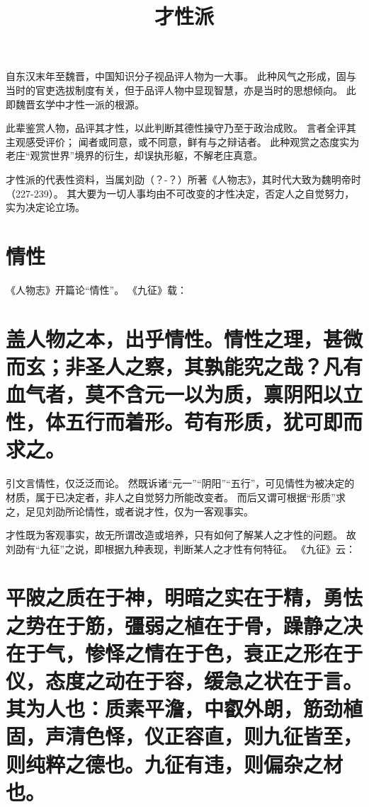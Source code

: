 \documentclass[11pt]{article}
\title{才性派}
\date{}
\begin{document}
  \maketitle

  \linenumbers

自东汉末年至魏晋，中国知识分子视品评人物为一大事。
此种风气之形成，固与当时的官吏选拔制度有关，但于品评人物中显现智慧，亦是当时的思想倾向。
此即魏晋玄学中才性一派的根源。

\par

此辈鉴赏人物，品评其才性，以此判断其德性操守乃至于政治成败。
言者全评其主观感受评价；
闻者或同意，或不同意，鲜有与之辩诘者。
此种观赏之态度实为老庄“观赏世界”境界的衍生，却误执形躯，不解老庄真意。

\par

才性派的代表性资料，当属刘劭（？-？）所著《人物志》，其时代大致为魏明帝时（227-239）。
其大要为一切人事均由不可改变的才性决定，否定人之自觉努力，实为决定论立场。

\section{情性}
《人物志》开篇论“情性”。
《九征》载：

\section{盖人物之本，出乎情性。情性之理，甚微而玄；非圣人之察，其孰能究之哉？凡有血气者，莫不含元一以为质，禀阴阳以立性，体五行而着形。苟有形质，犹可即而求之。}

引文言情性，仅泛泛而论。
然既诉诸“元一”“阴阳”“五行”，可见情性为被决定的材质，属于已决定者，非人之自觉努力所能改变者。
而后又谓可根据“形质”求之，足见刘劭所论情性，或者说才性，仅为一客观事实。

\par

才性既为客观事实，故无所谓改造或培养，只有如何了解某人之才性的问题。
故刘劭有“九征”之说，即根据九种表现，判断某人之才性有何特征。
《九征》云：

\section{平陂之质在于神，明暗之实在于精，勇怯之势在于筋，彊弱之植在于骨，躁静之决在于气，惨怿之情在于色，衰正之形在于仪，态度之动在于容，缓急之状在于言。其为人也：质素平澹，中叡外朗，筋劲植固，声清色怿，仪正容直，则九征皆至，则纯粹之德也。九征有违，则偏杂之材也。}
\end{document}
